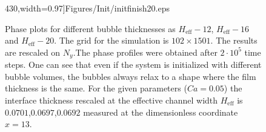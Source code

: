 \documentclass[preprint,12pt]{elsarticle}
\begin{document}
\begin{figure}
430,width=0.97\textwidth]{Figures/Init/initfinish20.eps}\\
\caption{Phase plots for different bubble thicknesses as
$H_{\mathrm{eff}}-12$, $H_{\mathrm{eff}}-16$ and
$H_{\mathrm{eff}}-20$. The grid for the simulation is $102 \times 1501$. The results are rescaled
on $N_y$.The phase
profiles were obtained after $2\cdot10^5$ time steps. One can see that even if the
system is initialized with different bubble volumes, the bubbles always relax
to a shape where the film thickness is the same. For the given parameters ($Ca=0.05$) the
interface thickness rescaled at the effective channel width $H_{\mathrm{eff}}$  is
$0.0701$,$0.0697$,$0.0692$ measured at the dimensionless coordinate $x=13$.
\label{fig:different:initialization:widths}}
\end{figure}
\end{document}
